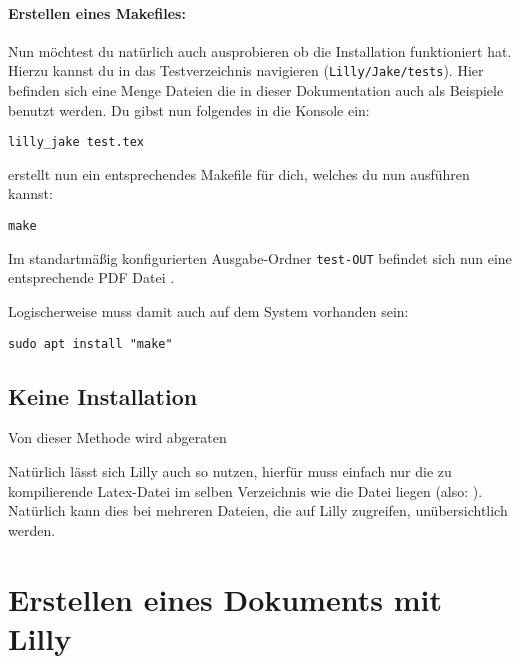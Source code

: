 \paragraph{Erstellen eines Makefiles:}
Nun möchtest du natürlich auch ausprobieren ob die Installation funktioniert hat. 
Hierzu kannst du in das Testverzeichnis navigieren (\verb|Lilly/Jake/tests|). 
Hier befinden sich eine Menge Dateien die in dieser Dokumentation auch als Beispiele benutzt werden.
Du gibst nun folgendes in die Konsole ein: 
\begin{lstlisting}[style=bash]
lilly_jake test.tex
\end{lstlisting}
\Jake erstellt nun ein entsprechendes Makefile für dich, welches du nun ausführen kannst:
\begin{lstlisting}[style=bash]
make 
\end{lstlisting}
Im standartmäßig konfigurierten Ausgabe-Ordner \verb|test-OUT| befindet sich nun eine entsprechende PDF
Datei \Smiley.\smallskip
\begin{bemerkung}[make]
    Logischerweise muss damit auch  auf dem System vorhanden sein:
\begin{lstlisting}[style=bash]
sudo apt install "make"
\end{lstlisting}
\end{bemerkung}

\subsection{Keine Installation}
\begin{bemerkung}
    Von dieser Methode wird abgeraten
\end{bemerkung}
Natürlich lässt sich Lilly auch so nutzen, hierfür muss einfach nur die zu kompilierende Latex-Datei im selben Verzeichnis wie die Datei  liegen (also: ). Natürlich kann dies bei mehreren Dateien, die auf Lilly zugreifen, unübersichtlich werden.
\clearpage
\section[Erstellen eines Dokuments mit Lilly]{Erstellen eines Dokuments mit Lilly \tiny{}}
